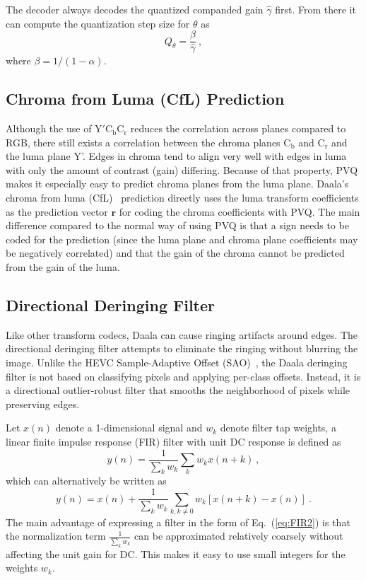 \documentclass[english,conference,10pt]{IEEEtran}
\begin{document}
The decoder always decodes the quantized companded gain $\hat{\gamma}$
first. From there it can compute the quantization step size for $\theta$ as
\begin{equation}
Q_\theta = \frac{\beta}{\hat{\gamma}}\ ,
\end{equation}
where $\beta = 1/(1-\alpha)$.

\subsection{Chroma from Luma (CfL) Prediction}

Although the use of $\mathrm{Y'C_bC_r}$ reduces the correlation across planes
compared to RGB, there still exists a correlation between the chroma planes
$\mathrm{C_b}$ and $\mathrm{C_r}$ and the luma plane Y'. Edges in chroma tend to
align very well with edges in luma with only the amount of contrast (gain) differing.
Because of that property, PVQ makes it especially easy to predict
chroma planes from the luma plane. Daala's chroma from luma (CfL)~\cite{egge2015spie}
prediction directly uses the luma transform coefficients as the prediction vector
$\mathbf{r}$ for coding the chroma coefficients with PVQ. The main difference compared
to the normal way of using PVQ is that a sign needs to be coded for the prediction
(since the luma plane and chroma plane coefficients may be negatively correlated) and
that the gain of the chroma cannot be predicted from the gain of the luma.


\subsection{Directional Deringing Filter}

Like other transform codecs, Daala can cause ringing artifacts around edges.
The directional deringing filter attempts to eliminate the ringing without
blurring the image. Unlike the HEVC Sample-Adaptive Offset (SAO)~\cite{HEVC-SAO},
the Daala deringing filter is not based on classifying pixels and applying per-class
offsets. Instead, it is a directional outlier-robust filter that smooths the
neighborhood of pixels while preserving edges.

Let $x\left(n\right)$ denote a 1-dimensional signal and $w_{k}$
denote filter tap weights, a linear finite impulse response (FIR)
filter with unit DC response is defined as
\begin{equation}
y\left(n\right)=\frac{1}{\sum_{k}w_{k}}\sum_{k}w_{k}x\left(n+k\right)\ ,\label{eq:FIR1}
\end{equation}
which can alternatively be written as
\begin{equation}
y\left(n\right)=x\left(n\right)+\frac{1}{\sum_{k}w_{k}}\sum_{k,k\neq0}w_{k}\left[x\left(n+k\right)-x\left(n\right)\right]\ .\label{eq:FIR2}
\end{equation}
The main advantage of expressing a filter in the form of Eq.~(\ref{eq:FIR2})
is that the normalization term $\frac{1}{\sum_{k}w_{k}}$ can be approximated
relatively coarsely without affecting the unit gain for DC. This makes
it easy to use small integers for the weights $w_{k}$.
\end{document}
